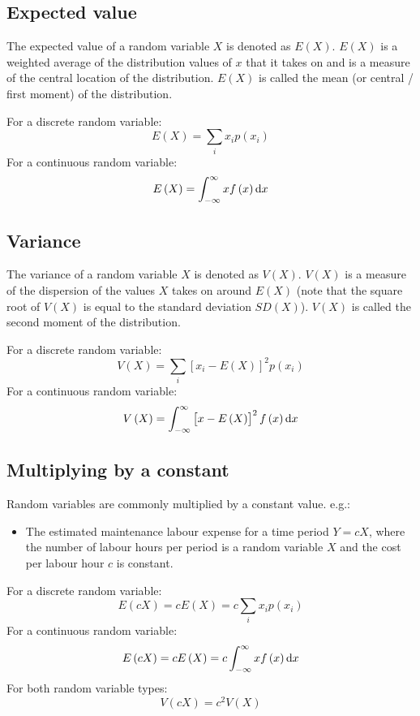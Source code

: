 \subsection{Expected value}
The expected value of a random variable $X$ is denoted as $E\left(X\right)$. $E\left(X\right)$ is a weighted average of the distribution values of $x$ that it takes on and is a measure of the central location of the distribution. $E\left(X\right)$ is called the mean (or central / first moment) of the distribution.

For a discrete random variable:
\begin{equation}
    E\left(X\right) = \sum_i x_i p\left(x_i\right)
\end{equation}
For a continuous random variable:
\begin{equation}
    E\left(X\right) = \int_{-\infty}^{\infty} x f\left(x\right)\dif x
\end{equation}
\subsection{Variance}
The variance of a random variable $X$ is denoted as $V\left(X\right)$. $V\left(X\right)$ is a measure of the dispersion of the values $X$ takes on around $E\left(X\right)$ (note that the square root of $V\left(X\right)$ is equal to the standard deviation $SD\left(X\right)$). $V\left(X\right)$ is called the second moment of the distribution.

For a discrete random variable:
\begin{equation}
    V\left(X\right) = \sum_i \left[x_i - E\left(X\right)\right]^2 p\left(x_i\right)
\end{equation}
For a continuous random variable:
\begin{equation}
    V\left(X\right) = \int_{-\infty}^{\infty} \left[x - E\left(X\right)\right]^2 f\left(x\right) \dif x
\end{equation}
\subsection{Multiplying by a constant}
Random variables are commonly multiplied by a constant value. e.g.:
\begin{itemize}
    \item The estimated maintenance labour expense for a time period $Y = cX$, where the number of labour hours per period is a random variable $X$ and the cost per labour hour $c$ is constant.
\end{itemize}
For a discrete random variable:
\begin{equation}
    E\left(cX\right) = cE\left(X\right) = c\sum_i x_i p\left(x_i\right)
\end{equation}
For a continuous random variable:
\begin{equation}
    E\left(cX\right) = cE\left(X\right) = c \int_{-\infty}^{\infty} x f\left(x\right) \dif x
\end{equation}
For both random variable types:
\begin{equation}
    V\left(cX\right) = c^2 V\left(X\right)
\end{equation}
